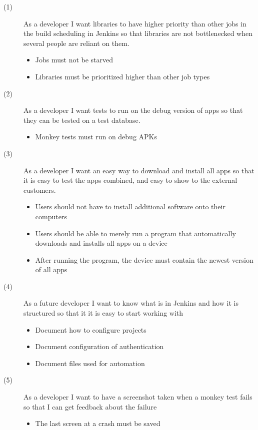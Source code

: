 \begin{description}
  \item[(1)] As a developer I want libraries to have higher priority than other jobs in the build scheduling in Jenkins so that libraries are not bottlenecked when several people are reliant on them.
  \begin{itemize}
    \item Jobs must not be starved
    \item Libraries must be prioritized higher than other job types
  \end{itemize}
  \item[(2)] As a developer I want tests to run on the debug version of apps so that they can be tested on a test database.
  \begin{itemize}
    \item Monkey tests must run on debug APKs
  \end{itemize}
  \item[(3)] As a developer I want an easy way to download and install all apps so that it is easy to test the apps combined, and easy to show to the external customers.
  \begin{itemize}
    \item Users should not have to install additional software onto their computers
    \item Users should be able to merely run a program that automatically downloads and installs all apps on a device
    \item After running the program, the device must contain the newest version of all apps 
  \end{itemize}
  \item[(4)] As a future developer I want to know what is in Jenkins and how it is structured so that it it is easy to start working with 
  \begin{itemize}
    \item Document how to configure projects
    \item Document configuration of authentication
    \item Document files used for automation
  \end{itemize}
  \item[(5)] As a developer I want to have a screenshot taken when a monkey test fails so that I can get feedback about the failure
  \begin{itemize}
    \item The last screen at a crash must be saved
  \end{itemize}
\end{description}


